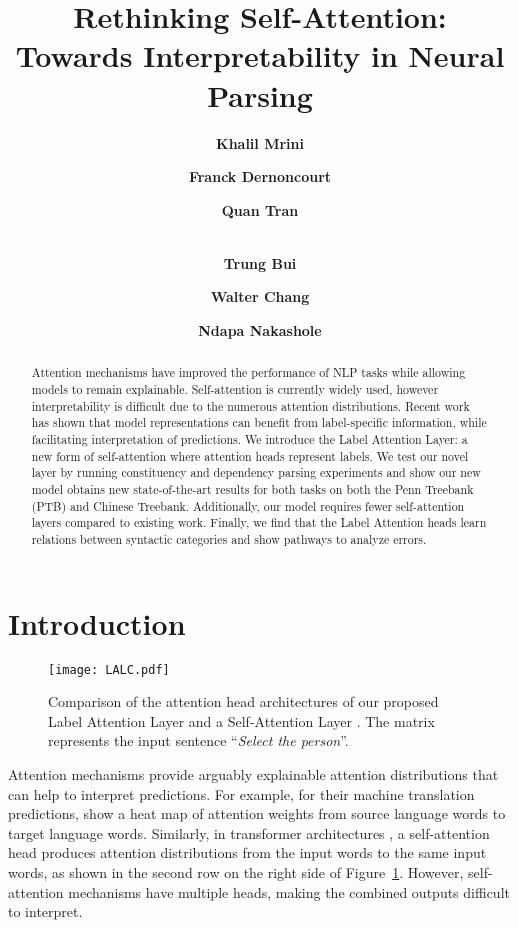 \documentclass[11pt,a4paper]{article}
\title{Rethinking Self-Attention: \\ Towards Interpretability in Neural Parsing}
\author[1]{\bf Khalil Mrini}
\author[2]{\bf Franck Dernoncourt}
\author[2]{\bf Quan Tran}
\author[2]{\\ \bf Trung Bui}
\author[2]{\bf Walter Chang}
\author[1]{\bf Ndapa Nakashole}
\affil[1]{
University of California, San Diego,
La Jolla, CA 92093 \protect\\
\small{\texttt{khalil@ucsd.edu, nnakashole@eng.ucsd.edu}}}
\affil[2]{Adobe Research,
San Jose, CA 95110 \protect\\
\small{\texttt{\{franck.dernoncourt, qtran, bui, wachang\}@adobe.com}}}
\date{}
\begin{document}
\maketitle
\begin{abstract}
Attention mechanisms have improved the performance of NLP tasks while allowing models to remain explainable.
Self-attention is currently widely used, however interpretability is difficult due to the numerous attention distributions. Recent work has shown that model representations can benefit from label-specific information, while facilitating interpretation of predictions. We introduce the Label Attention Layer: a new form of self-attention where attention heads represent labels. We test our novel layer by running constituency and dependency parsing experiments and show our new model obtains new state-of-the-art results for both tasks on both the Penn Treebank (PTB) and Chinese Treebank.
Additionally, our model requires fewer self-attention layers compared to existing work.
Finally, we find that the Label Attention heads learn relations between syntactic categories and show pathways to analyze errors.
\end{abstract}

\section{Introduction}

\begin{figure}
    \centering
    \texttt{[image: LALC.pdf]}
    \caption{Comparison of the attention head architectures of our proposed Label Attention Layer and a Self-Attention Layer \cite{vaswani2017attention}. The matrix  represents the input sentence ``\textit{Select the person}''.}
    \label{lalc}
\end{figure}

Attention mechanisms \cite{bahdanau2014neural, luong2015effective} provide arguably explainable attention distributions that can help to interpret predictions. For example, for their machine translation predictions, \citet{bahdanau2014neural} show a heat map of attention weights from source language words to target language words. Similarly, in transformer architectures \cite{vaswani2017attention}, a self-attention head produces attention distributions from the input words to the same input words, as shown in the second row on the right side of Figure~\ref{lalc}. However, self-attention mechanisms have multiple heads, making the combined outputs difficult to interpret.
\end{document}
